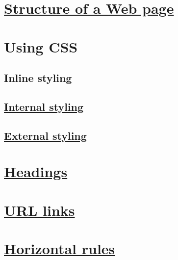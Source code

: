 
\chapter{\href{http://www.w3schools.com/html/html_head.asp}{Structure of a Web page}}



\chapter{Using CSS}
\section{Inline styling}

\section{\href{internal-css.html}{Internal styling}}

\section{\href{externla-css}{External styling}}



\chapter{\href{http://www.w3schools.com/html/html_headings.asp}{Headings}}



\chapter{\href{http://www.w3schools.com/html/html_links.asp}{URL links}}



\chapter{\href{http://www.w3schools.com/tags/tag_hr.asp}{Horizontal rules}}


